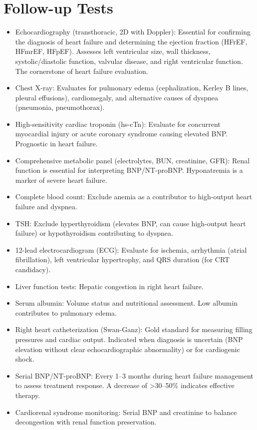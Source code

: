 \section*{Follow-up Tests}
\begin{itemize}
  \item Echocardiography (transthoracic, 2D with Doppler): Essential for confirming the diagnosis of heart failure and determining the ejection fraction (HFrEF, HFmrEF, HFpEF). Assesses left ventricular size, wall thickness, systolic/diastolic function, valvular disease, and right ventricular function. The cornerstone of heart failure evaluation.
  \item Chest X-ray: Evaluates for pulmonary edema (cephalization, Kerley B lines, pleural effusions), cardiomegaly, and alternative causes of dyspnea (pneumonia, pneumothorax).
  \item High-sensitivity cardiac troponin (hs-cTn): Evaluate for concurrent myocardial injury or acute coronary syndrome causing elevated BNP. Prognostic in heart failure.
  \item Comprehensive metabolic panel (electrolytes, BUN, creatinine, GFR): Renal function is essential for interpreting BNP/NT-proBNP. Hyponatremia is a marker of severe heart failure.
  \item Complete blood count: Exclude anemia as a contributor to high-output heart failure and dyspnea.
  \item TSH: Exclude hyperthyroidism (elevates BNP, can cause high-output heart failure) or hypothyroidism contributing to dyspnea.
  \item 12-lead electrocardiogram (ECG): Evaluate for ischemia, arrhythmia (atrial fibrillation), left ventricular hypertrophy, and QRS duration (for CRT candidacy).
  \item Liver function tests: Hepatic congestion in right heart failure.
  \item Serum albumin: Volume status and nutritional assessment. Low albumin contributes to pulmonary edema.
  \item Right heart catheterization (Swan-Ganz): Gold standard for measuring filling pressures and cardiac output. Indicated when diagnosis is uncertain (BNP elevation without clear echocardiographic abnormality) or for cardiogenic shock.
  \item Serial BNP/NT-proBNP: Every 1--3 months during heart failure management to assess treatment response. A decrease of >30--50\% indicates effective therapy.
  \item Cardiorenal syndrome monitoring: Serial BNP and creatinine to balance decongestion with renal function preservation.
\end{itemize}


